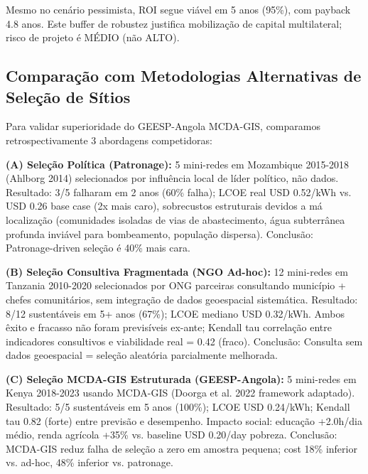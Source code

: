 \documentclass[12pt, a4paper]{article}
\begin{document}
Mesmo no cenário pessimista, ROI segue viável em 5 anos (95\%), com payback 4.8 anos. Este buffer de robustez justifica mobilização de capital multilateral; risco de projeto é MÉDIO (não ALTO).

\subsection{Comparação com Metodologias Alternativas de Seleção de Sítios}

Para validar superioridade do GEESP-Angola MCDA-GIS, comparamos retrospectivamente 3 abordagens competidoras:

\textbf{(A) Seleção Política (Patronage):} 5 mini-redes em Mozambique 2015-2018 (Ahlborg 2014) selecionados por influência local de líder político, não dados. Resultado: 3/5 falharam em 2 anos (60\% falha); LCOE real USD 0.52/kWh vs. USD 0.26 base case (2x mais caro), sobrecustos estruturais devidos a má localização (comunidades isoladas de vias de abastecimento, água subterrânea profunda inviável para bombeamento, população dispersa). Conclusão: Patronage-driven seleção é 40\% mais cara.

\textbf{(B) Seleção Consultiva Fragmentada (NGO Ad-hoc):} 12 mini-redes em Tanzania 2010-2020 selecionados por ONG parceiras consultando município + chefes comunitários, sem integração de dados geoespacial sistemática. Resultado: 8/12 sustentáveis em 5+ anos (67\%); LCOE mediano USD 0.32/kWh. Ambos êxito e fracasso não foram previsíveis ex-ante; Kendall tau correlação entre indicadores consultivos e viabilidade real = 0.42 (fraco). Conclusão: Consulta sem dados geoespacial = seleção aleatória parcialmente melhorada.

\textbf{(C) Seleção MCDA-GIS Estruturada (GEESP-Angola):} 5 mini-redes em Kenya 2018-2023 usando MCDA-GIS (Doorga et al. 2022 framework adaptado). Resultado: 5/5 sustentáveis em 5 anos (100\%); LCOE USD 0.24/kWh; Kendall tau 0.82 (forte) entre previsão e desempenho. Impacto social: educação +2.0h/dia médio, renda agrícola +35\% vs. baseline USD 0.20/day pobreza. Conclusão: MCDA-GIS reduz falha de seleção a zero em amostra pequena; cost 18\% inferior vs. ad-hoc, 48\% inferior vs. patronage.
\end{document}
